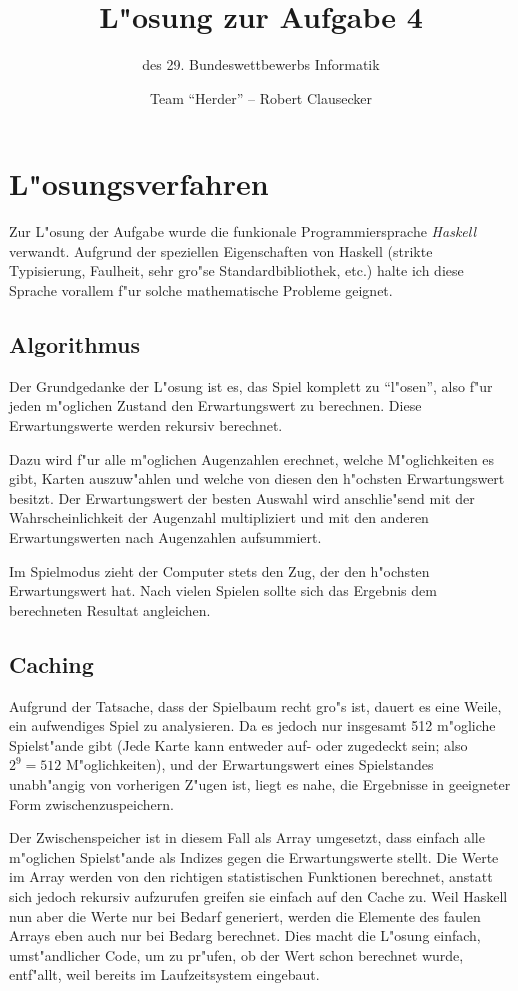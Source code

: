 \documentclass{scrreprt}
\author {Team "`Herder"' -- Robert Clausecker}
\title {L"osung zur Aufgabe 4}
\subtitle {des 29. Bundeswettbewerbs Informatik}
\begin{document}
\maketitle

\tableofcontents \newpage

\chapter{L"osungsverfahren}
Zur L"osung der Aufgabe wurde die funkionale Programmiersprache \emph{Haskell}
verwandt. Aufgrund der speziellen Eigenschaften von Haskell (strikte
Typisierung, Faulheit, sehr gro"se Standardbibliothek, etc.) halte ich diese 
Sprache vorallem f"ur solche mathematische Probleme geignet.

\section{Algorithmus}
Der Grundgedanke der L"osung ist es, das Spiel komplett zu "`l"osen"', also f"ur
jeden m"oglichen Zustand den Erwartungswert zu berechnen.  Diese Erwartungswerte
werden rekursiv berechnet.

Dazu wird f"ur alle m"oglichen Augenzahlen erechnet, welche M"oglichkeiten es
gibt, Karten auszuw"ahlen und welche von diesen den h"ochsten Erwartungswert
besitzt.  Der Erwartungswert der besten Auswahl wird anschlie"send mit der
Wahrscheinlichkeit der Augenzahl multipliziert und mit den anderen
Erwartungswerten nach Augenzahlen aufsummiert.

Im Spielmodus zieht der Computer stets den Zug, der den h"ochsten Erwartungswert
hat.  Nach vielen Spielen sollte sich das Ergebnis dem berechneten Resultat
angleichen.

\section{Caching}
Aufgrund der Tatsache, dass der Spielbaum recht gro"s ist, dauert es eine Weile,
ein aufwendiges Spiel zu analysieren.  Da es jedoch nur insgesamt 512 m"ogliche
Spielst"ande gibt (Jede Karte kann entweder auf- oder zugedeckt sein; also $2^9
= 512$ M"oglichkeiten), und der Erwartungswert eines Spielstandes unabh"angig
von vorherigen Z"ugen ist, liegt es nahe, die Ergebnisse in geeigneter Form
zwischenzuspeichern.

Der Zwischenspeicher ist in diesem Fall als Array umgesetzt, dass einfach alle
m"oglichen Spielst"ande als Indizes gegen die Erwartungswerte stellt.  Die Werte
im Array werden von den richtigen statistischen Funktionen berechnet, anstatt
sich jedoch rekursiv aufzurufen greifen sie einfach auf den Cache zu.  Weil
Haskell nun aber die Werte nur bei Bedarf generiert, werden die Elemente des
faulen Arrays eben auch nur bei Bedarg berechnet.  Dies macht die L"osung
einfach, umst"andlicher Code, um zu pr"ufen, ob der Wert schon berechnet wurde,
entf"allt, weil bereits im Laufzeitsystem eingebaut.
\end{document}
